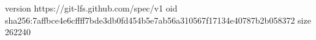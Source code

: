 version https://git-lfs.github.com/spec/v1
oid sha256:7affbce4e6cffff7bde3db0fd454b5e7ab56a310567f17134e40787b2b058372
size 262240

